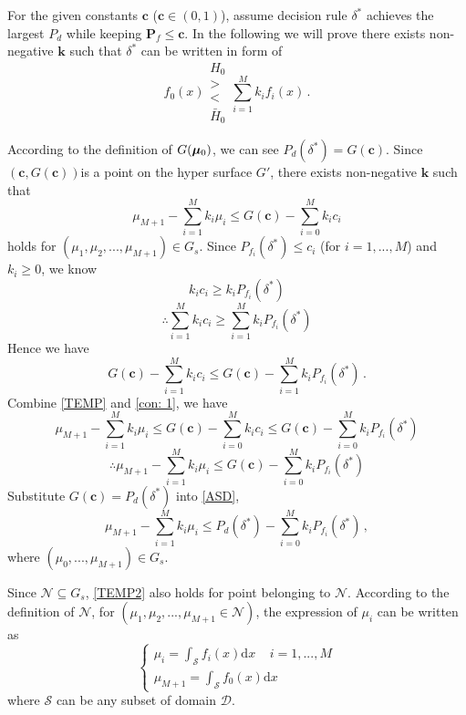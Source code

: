For the given constants $\mathbf{c}$ ($\mathbf{c} \in (0, 1)$), 
 assume decision rule $\delta^\ast$  achieves the largest $P_d$  while keeping $\mathbf{P}_f \leq \mathbf{c}$. In the following we will prove there exists non-negative $\mathbf{k}$  such that $\delta^\ast$ can be written in form of 
\[
f_0(x) \substack{H_0 \\ > \\ < \\ \bar{H}_0 } \sum_{i=1}^{M}k_if_i(x)\,.
\]

According to the definition of $G(\boldsymbol{\mu}_0)$, we can see $P_d(\delta^\ast) = G(\mathbf{c})$. Since $(\mathbf{c}, G(\mathbf{c}))$is a point on the hyper surface $G'$,  there exists non-negative $\mathbf{k}$ such that 
\begin{equation}
\label{TEMP}
\mu_{M+1} - \sum_{i=1}^{M}k_i\mu_i \leq G(\mathbf{c}) - \sum_{i=0}^{M}k_ic_i
\end{equation}
holds for $(\mu_1, \mu_2, ..., \mu_{M+1}) \in G_s$.
Since $P_{f_i}(\delta^\ast) \leq c_i$ (for $i=1, ..., M$) and $k_i \geq 0$, we know
\[
k_ic_i \geq k_iP_{f_i}(\delta^\ast)
\]
\[
\therefore \sum_{i=1}^{M}k_ic_i \geq \sum_{i=1}^{M}k_iP_{f_i}(\delta^\ast)
\]
Hence we have
\begin{equation}
\label{con: 1}
G(\mathbf{c}) - \sum_{i=1}^{M}k_ic_i \leq G(\mathbf{c}) - \sum_{i=1}^{M}k_iP_{f_i}(\delta^\ast)\,.
\end{equation}
Combine \eqref{TEMP} and \eqref{con: 1}, we have 
\begin{equation}
\label{equ: TEMP3}
\mu_{M+1} - \sum_{i=1}^{M}k_i\mu_i \leq G(\mathbf{c}) - \sum_{i=0}^{M}k_ic_i \leq G(\mathbf{c}) - \sum_{i=0}^{M}k_iP_{f_i}(\delta^\ast)
\end{equation}
\begin{equation}
\label{ASD}
\therefore \mu_{M+1} - \sum_{i=1}^{M}k_i\mu_i \leq G(\mathbf{c}) - \sum_{i=0}^{M}k_iP_{f_i}(\delta^\ast)
\end{equation}
Substitute $G(\mathbf{c}) = P_d(\delta^\ast)$ into \eqref{ASD}, 
\begin{equation}
\label{TEMP2}
\mu_{M+1} - \sum_{i=1}^{M}k_i\mu_i \leq P_d(\delta^\ast) - \sum_{i=0}^{M}k_iP_{f_i}(\delta^\ast)\,,
\end{equation}
where $(\mu_0, ..., \mu_{M+1}) \in G_s$.

Since $\mathcal{N} \subseteq G_s$, \eqref{TEMP2} also holds for point belonging to $\mathcal{N}$.
According to the definition of $\mathcal{N}$, for $(\mu_1, \mu_2, ..., \mu_{M+1} \in \mathcal{N})$, the expression of $\mu_i$  can be written as 
\begin{equation}
\label{def: mu}
\begin{cases}
\mu_i = \int_{\mathcal{S}}f_i(x)\mathrm{d}x \;\;\;\;i = 1, ..., M\\
\mu_{M+1} = \int_{\mathcal{S}}f_{0}(x)\mathrm{d}x
\end{cases}
\end{equation}
where $\mathcal{S}$ can be any subset of domain $\mathcal{D}$. 

